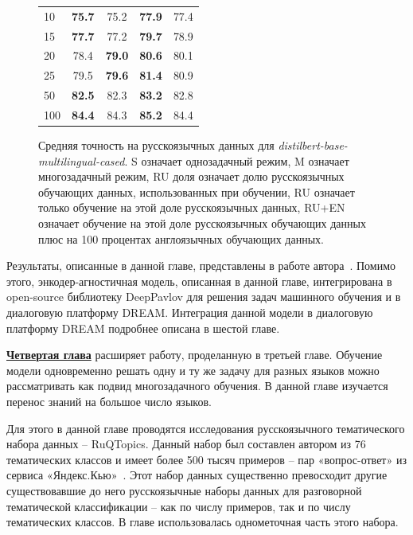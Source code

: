 \begin{figure}[!htbp]
\begin{minipage}{0.45\textwidth}
{{\begin{tabular}[baseline={(0,2.1)}]{|l||c|c|c|c|}
10 & \textbf{75.7} & 75.2 & \textbf{77.9} & 77.4\\ 
15 & \textbf{77.7} & 77.2 & \textbf{79.7} & 78.9\\ 
20 & 78.4 & \textbf{79.0} & \textbf{80.6} & 80.1 \\ 
25 & 79.5 & \textbf{79.6} & \textbf{81.4} & 80.9 \\ 
50 & \textbf{82.5} & 82.3 & \textbf{83.2} & 82.8 \\ 
100 & \textbf{84.4} & 84.3 & \textbf{85.2} & 84.4 \\ \hline
\end{tabular}}
}
\end{minipage}
\caption{Средняя точность на русскоязычных данных для \textit{distilbert-base-multilingual-cased}. S означает однозадачный режим, M означает многозадачный режим, RU доля означает долю русскоязычных обучающих данных, использованных при обучении, RU означает только обучение на этой доле русскоязычных данных, RU+EN означает обучение на этой доле русскоязычных обучающих данных плюс на 100 процентах англоязычных обучающих данных.}
\label{fig:tr-ag:ru_dialog_part}
\end{figure}

Результаты, описанные в данной главе, представлены в работе автора~\cite{rumtl}. Помимо этого, энкодер-агностичная модель, описанная в данной главе, интегрирована в open-source библиотеку DeepPavlov для решения задач машинного обучения и в диалоговую платформу DREAM. Интеграция данной модели в диалоговую платформу DREAM подробнее описана в {шестой главе}.

\underline{\textbf{Четвертая глава}} расширяет работу, проделанную в {третьей главе}. Обучение модели одновременно решать одну и ту же задачу для разных языков можно рассматривать как подвид многозадачного обучения. В данной главе изучается перенос знаний на большое число языков. 

Для этого в данной главе проводятся исследования русскоязычного тематического набора данных -- RuQTopics.  Данный набор был составлен автором из 76 тематических классов и имеет более 500 тысяч примеров -- пар «вопрос-ответ» из сервиса «Яндекс.Кью»~\cite{yandex_q}. Этот набор данных существенно превосходит другие существовавшие до него русскоязычные наборы данных для разговорной тематической классификации -- как по числу примеров, так и по числу тематических классов. В главе использовалась однометочная часть этого набора. 

